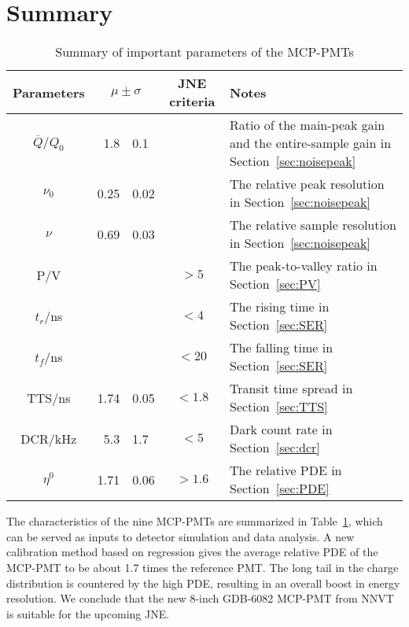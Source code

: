 \section{Summary}
\label{Summary}
\begin{table}
    \centering
    \caption{Summary of important parameters of the MCP-PMTs}
    \label{tab:summary}
    \begin{tabularx}{\textwidth}{c|r @{$\pm$} l |c|X}
        \hline
        Parameters&\multicolumn{2}{c}{$\mu\pm\sigma$}\vline&JNE criteria&Notes\\
        \hline
        $\overline{Q}/Q_0$&1.8&0.1&&Ratio of the main-peak gain and the entire-sample gain in Section~\ref{sec:noisepeak}\\
        $\nu_0$&0.25&0.02&&The relative peak resolution in Section~\ref{sec:noisepeak}\\
        $\nu$&0.69&0.03&&The relative sample resolution in Section~\ref{sec:noisepeak}\\
        P/V&&&$>5$&The peak-to-valley ratio in Section~\ref{sec:PV}\\
        $t_r$/ns&&&$<4$&The rising time in Section~\ref{sec:SER}\\
        $t_f$/ns&&&$<20$&The falling time in Section~\ref{sec:SER}\\
        TTS/ns&1.74&0.05&$<1.8$&Transit time spread in Section~\ref{sec:TTS}\\
        DCR/kHz&5.3&1.7&$<5$&Dark count rate in Section~\ref{sec:dcr}\\
        $\eta^0$&1.71&0.06&$>1.6$&The relative PDE in Section~\ref{sec:PDE}\\
        \hline
    \end{tabularx}
\end{table}

The characteristics of the nine MCP-PMTs are summarized in Table~\ref{tab:summary}, which can be served as inputs to detector simulation and data analysis. A new calibration method based on regression gives the average relative PDE of the MCP-PMT to be about 1.7 times the reference PMT. The long tail in the charge distribution is countered by the high PDE, resulting in an overall boost in energy resolution. We conclude that the new 8-inch GDB-6082 MCP-PMT from NNVT is suitable for the upcoming JNE.